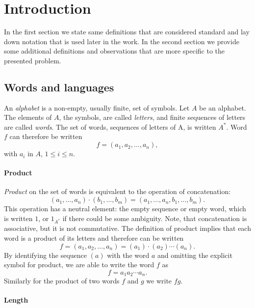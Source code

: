 \chapter{Introduction}

In the first section we state same definitions that are considered standard and lay down notation that is used later in the work. In the second section we provide some additional definitions and observations that are more specific to the presented problem.


\section{Words and languages}

An \emph{alphabet} is a non-empty, usually finite, set of symbols. Let $A$ be an alphabet. The elements of $A$, the symbols, are called \emph{letters}, and finite sequences of letters are called \emph{words}. The set of words, sequences of letters of A, is written $A^*$.  Word $f$ can therefore be written
\[
    f = (a_1, a_2, \dotsc, a_n),
\]
with $a_i$ in $A$, $1 \leq i \leq n$.

\subsubsection*{Product}

\emph{Product} on the set of words is equivalent to the operation of concatenation:
\[
    (a_1, \dotsc, a_n) \cdot (b_1, \dotsc, b_m) = (a_1, \dotsc, a_n, b_1, \dotsc, b_m).
\]
This operation has a neutral element: the empty sequence or empty word, which is written $1$, or $1_{A^*}$ if there could be some ambiguity. Note, that concatenation is associative, but it is not commutative. The definition of product implies that each word is a product of its letters and therefore can be written
\[
    f = (a_1, a_2, \dotsc, a_n) = (a_1) \cdot (a_2) \dotsm (a_n).
\]
By identifying the sequence $(a)$ with the word $a$ and omitting the explicit symbol for product, we are able to write the word $f$ as
\[
    f = a_1 a_2 \dotsm a_n.
\]
Similarly for the product of two words $f$ and $g$ we write $fg$.

\subsubsection*{Length}

